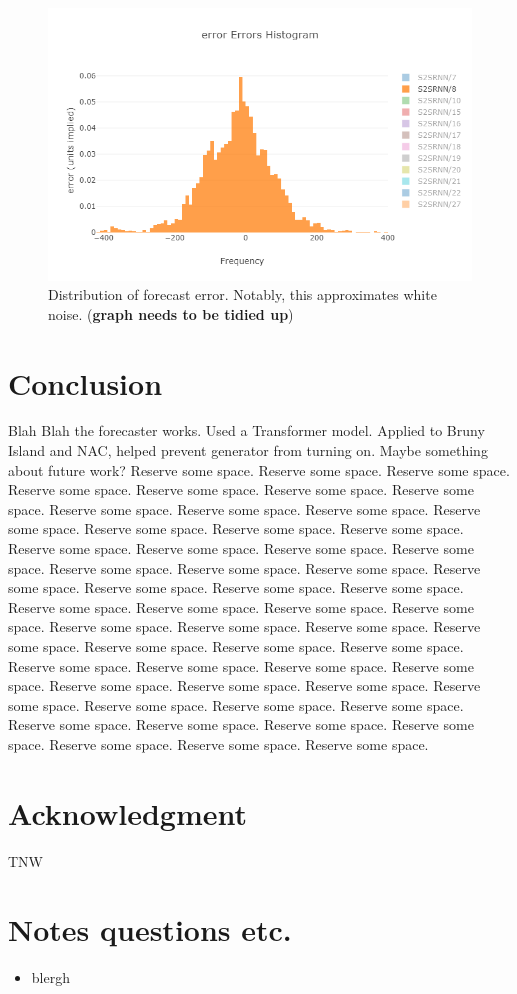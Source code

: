 \documentclass[conference]{IEEEtran}
\begin{document}
\begin{figure}[htbp]
	\centerline{\includegraphics[width=.35\textwidth]{images/errors_histogram.png}}
	\caption{Distribution of forecast error.
		     Notably, this approximates white noise.
		     (\textbf{graph needs to be tidied up})}
	\label{fig:bruny_hist}
\end{figure}





\section{Conclusion}
Blah Blah the forecaster works.
Used a Transformer model.
Applied to Bruny Island and NAC, helped prevent generator from turning on.
Maybe something about future work?
Reserve some space. Reserve some space. Reserve some space.
Reserve some space. Reserve some space. Reserve some space.
Reserve some space. Reserve some space. Reserve some space.
Reserve some space. Reserve some space. Reserve some space.
Reserve some space. Reserve some space. Reserve some space.
Reserve some space. Reserve some space. Reserve some space.
Reserve some space. Reserve some space. Reserve some space.
Reserve some space. Reserve some space. Reserve some space.
Reserve some space. Reserve some space. Reserve some space.
Reserve some space. Reserve some space. Reserve some space.
Reserve some space. Reserve some space. Reserve some space.
Reserve some space. Reserve some space. Reserve some space.
Reserve some space. Reserve some space. Reserve some space.
Reserve some space. Reserve some space. Reserve some space.
Reserve some space. Reserve some space. Reserve some space.
Reserve some space. Reserve some space. Reserve some space.
Reserve some space. Reserve some space. Reserve some space.
Reserve some space. Reserve some space. Reserve some space.



\section*{Acknowledgment}
TNW





\section{Notes questions etc.} 
\begin{itemize}
	\item blergh
\end{itemize}
\end{document}
